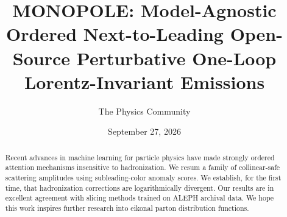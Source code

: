 \documentclass[11pt]{article}
\title{MONOPOLE: Model-Agnostic Ordered Next-to-Leading Open-Source Perturbative One-Loop Lorentz-Invariant Emissions}
\author{The Physics Community}
\date{September 27, 2026}
\begin{document}
\maketitle
\begin{abstract}
Recent advances in machine learning for particle physics have made
strongly ordered attention mechanisms insensitive to hadronization. We
resum a family of collinear-safe scattering amplitudes using
subleading-color anomaly scores. We establish, for the first time, that
hadronization corrections are logarithmically divergent. Our results are
in excellent agreement with slicing methods trained on ALEPH archival
data. We hope this work inspires further research into eikonal parton
distribution functions.
\end{abstract}
\tableofcontents




\nocite{*}


\end{document}
